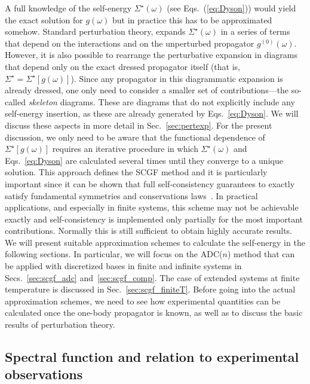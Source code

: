 
 A full knowledge of the self-energy  $\Sigma^{\star}(\omega)$ (see Eqs.~(\ref{eq:Dyson})) would yield the exact solution for $g(\omega)$ but in practice this has to be approximated somehow.
 Standard perturbation theory,  expands $\Sigma^{\star}(\omega)$ in a series of terms that depend on the interactions and on the unperturbed propagator $g^{(0)}(\omega)$.  However, it is also possible to rearrange the 
perturbative expansion in diagrams that depend only on the exact dressed propagator itself (that is, $\Sigma^{\star}=\Sigma^{\star}[g(\omega)]$).  Since any propagator in this diagrammatic expansion is already dressed, one only need to consider a smaller set of contributions---the so-called  {\em skeleton} diagrams.
These are diagrams that  do not explicitly include any self-energy insertion, as these are already generated by Eqs.~\eqref{eq:Dyson}. 
We will discuss these aspects in more detail in Sec.~\ref{sec:pertexp}.
%
For the present discussion, we only need to be aware that the functional dependence of $\Sigma^{\star}[g(\omega)]$  requires an iterative procedure in which  $\Sigma^{\star}(\omega)$ and Eqs.~\eqref{eq:Dyson} are calculated several times until they converge to a unique solution.
This approach defines the SCGF method and it is particularly important since it can be shown that full self-consistency guarantees to exactly satisfy fundamental symmetries and conservations laws~\cite{ch11_Baym1961,ch11_Baym1962}.
In practical applications, and especially in finite systems, this scheme may not be achievable exactly and self-consistency is implemented only partially for the most important contributions. Normally this is still sufficient to obtain highly accurate results.
 We will present suitable approximation schemes to calculate the self-energy in the following sections. In particular, we will focus on the ADC($n$) method   that can be applied with discretized bases in finite and infinite systems in Secs.~\ref{sec:scgf_adc} and~\ref{sec:scgf_comp}. The case of extended systems at finite temperature is discussed in Sec.~\ref{sec:scgf_finiteT}.   Before going into the actual approximation schemes, we need to see how experimental quantities can be calculated  once the one-body propagator is known, as well as to discuss the basic results of  perturbation theory.




\subsection{Spectral function and relation to experimental observations}
\label{sec:scgf_obs}

